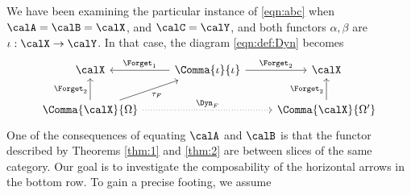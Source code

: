 \documentclass[12pt,oneside]{article}
\begin{document}
We have been examining the particular instance of \eqref{eqn:abc} when $\calA = \calB = \calX$, and $\calC = \calY$, and both functors $\alpha, \beta$ are  $\iota : \calX \to \calY$. In that case, the diagram \eqref{eqn:def:Dyn} becomes
%
\[\begin{tikzcd}
	\calX & \Comma{\iota}{\iota} \arrow[l, "\Forget_1"'] \arrow[r, "\Forget_2"] & \calX \\
	\Comma{\calX}{\Omega} \arrow[u, "\Forget_2"] \arrow[ru, "\tau_F"'] \arrow[rr, "\Dyn_F", dotted] & & \Comma{\calX}{\Omega'} \arrow[u, "\Forget_2"]
\end{tikzcd}\]
%
One of the consequences of equating $\calA$ and $\calB$ is that the functor described by Theorems \ref{thm:1} and \ref{thm:2} are between slices of the same category. Our goal is to investigate the composability of the horizontal arrows in the bottom row. To gain a precise footing, we assume
%

\end{document}
